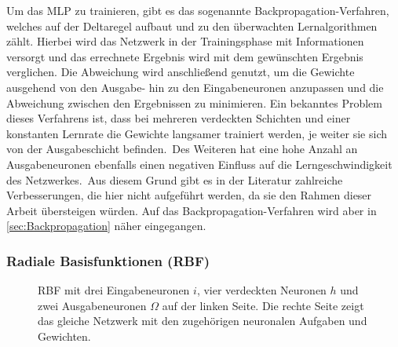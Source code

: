 Um das MLP zu trainieren, gibt es das sogenannte Backpropagation-Verfahren, welches auf der Deltaregel aufbaut und zu den überwachten Lernalgorithmen zählt. Hierbei wird das Netzwerk in der Trainingsphase mit Informationen versorgt und das errechnete Ergebnis wird mit dem gewünschten Ergebnis verglichen. Die Abweichung wird anschließend genutzt, um die Gewichte ausgehend von den Ausgabe- hin zu den Eingabeneuronen anzupassen und die Abweichung zwischen den Ergebnissen zu minimieren. Ein bekanntes Problem dieses Verfahrens ist, dass bei mehreren verdeckten Schichten und einer konstanten Lernrate die Gewichte langsamer trainiert werden, je weiter sie sich von der Ausgabeschicht befinden.\, Des Weiteren hat eine hohe Anzahl an Ausgabeneuronen ebenfalls einen negativen Einfluss auf die Lerngeschwindigkeit des Netzwerkes.\, Aus diesem Grund gibt es in der Literatur zahlreiche Verbesserungen, die hier nicht aufgeführt werden, da sie den Rahmen dieser Arbeit übersteigen würden. Auf das Backpropagation-Verfahren wird aber in \autoref{sec:Backpropagation} näher eingegangen. 


\subsubsection{Radiale Basisfunktionen (RBF)}
\begin{figure}[!hb]
    \centering
        
    \caption[Darstellung eines RBF]{RBF mit drei Eingabeneuronen $i$, vier verdeckten Neuronen $h$  und zwei Ausgabeneuronen $\Omega$ auf der linken Seite. Die rechte Seite zeigt das gleiche Netzwerk mit den zugehörigen neuronalen Aufgaben und Gewichten.\,\protect\footnotemark{}}
    \label{fig:RBF}
\end{figure}
\addtocounter{footnote}{-1}     %
\addtocounter{Hfootnote}{-1}    %
\wrapfigfoot{}

